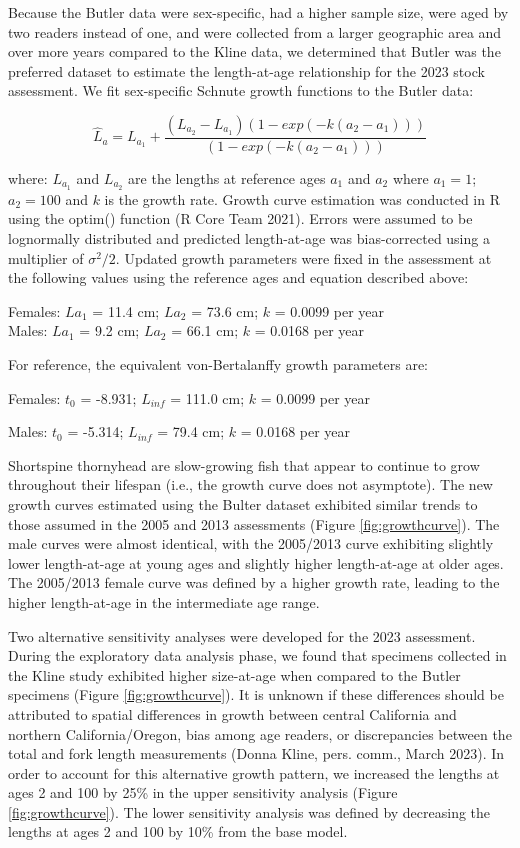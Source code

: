 \documentclass[11pt,
  english,
  letterpaper,
]{article}
\begin{document}
Because the Butler data were sex-specific, had a higher sample size, were aged by two readers instead of one, and were collected from a larger geographic area and over more years compared to the Kline data, we determined that Butler was the preferred dataset to estimate the length-at-age relationship for the 2023 stock assessment. We fit sex-specific Schnute growth functions to the Butler data:

\begin{equation} \hat{L}_{a} = L_{a_{1}}+\frac{(L_{a_{2}}-L_{a_{1}})(1-exp(-k(a_{2}-a_{1})))}{(1-exp(-k(a_{2}-a_{1})))}\end{equation}

where: \(L_{a_{1}}\) and \(L_{a_{2}}\) are the lengths at reference ages \(a_{1}\) and \(a_{2}\) where \(a_{1}=1\); \(a_{2}=100\) and \(k\) is the growth rate. Growth curve estimation was conducted in R using the optim() function (R Core Team 2021). Errors were assumed to be lognormally distributed and predicted length-at-age was bias-corrected using a multiplier of \(\sigma^2/2\). Updated growth parameters were fixed in the assessment at the following values using the reference ages and equation described above:

Females: \(L{a_{1}}\) = 11.4 cm; \(L{a_{2}}\) = 73.6 cm; \(k\) = 0.0099 per year\\
Males: \(L{a_{1}}\) = 9.2 cm; \(L{a_{2}}\) = 66.1 cm; \(k\) = 0.0168 per year

For reference, the equivalent von-Bertalanffy growth parameters are:

Females: \(t{_0}\) = -8.931; \(L{_{inf}}\) = 111.0 cm; \(k\) = 0.0099 per year

Males: \(t{_0}\) = -5.314; \(L{_{inf}}\) = 79.4 cm; \(k\) = 0.0168 per year

Shortspine thornyhead are slow-growing fish that appear to continue to grow throughout their lifespan (i.e., the growth curve does not asymptote). The new growth curves estimated using the Bulter dataset exhibited similar trends to those assumed in the 2005 and 2013 assessments (Figure \ref{fig:growthcurve}). The male curves were almost identical, with the 2005/2013 curve exhibiting slightly lower length-at-age at young ages and slightly higher length-at-age at older ages. The 2005/2013 female curve was defined by a higher growth rate, leading to the higher length-at-age in the intermediate age range.

Two alternative sensitivity analyses were developed for the 2023 assessment. During the exploratory data analysis phase, we found that specimens collected in the Kline study exhibited higher size-at-age when compared to the Butler specimens (Figure \ref{fig:growthcurve}). It is unknown if these differences should be attributed to spatial differences in growth between central California and northern California/Oregon, bias among age readers, or discrepancies between the total and fork length measurements (Donna Kline, pers. comm., March 2023). In order to account for this alternative growth pattern, we increased the lengths at ages 2 and 100 by 25\% in the upper sensitivity analysis (Figure \ref{fig:growthcurve}). The lower sensitivity analysis was defined by decreasing the lengths at ages 2 and 100 by 10\% from the base model.
\end{document}

